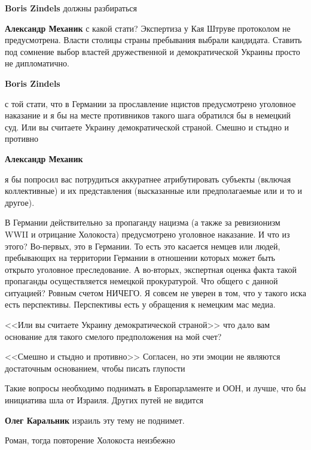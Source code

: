 \begin{itemize}
\begin{itemize}
\textbf{Boris Zindels} должны разбираться

\textbf{Александр Механик} с какой стати? Экспертиза у Кая Штруве протоколом не предусмотрена. Власти столицы страны пребывания выбрали кандидата. Ставить под сомнение выбор властей дружественной и демократической Украины просто не дипломатично.

\textbf{Boris Zindels} 

с той стати, что в Германии за прославление нцистов предусмотрено уголовное
наказание и я бы на месте противников такого шага обратился бы в немецкий суд.
Или вы считаете Украину демократической страной. Смешно и стыдно и противно

\textbf{Александр Механик} 

я бы попросил вас потрудиться аккуратнее атрибутировать субъекты (включая
коллективные) и их представления (высказанные или предполагаемые или и то и
другое).

В Германии действительно за пропаганду нацизма (а также за ревизионизм WWII и
отрицание Холокоста) предусмотрено уголовное наказание. И что из этого?
Во-первых, это в Германии. То есть это касается немцев или людей, пребывающих
на территории Германии в отношении которых может быть открыто уголовное
преследование. А во-вторых, экспертная оценка факта такой пропаганды
осуществляется немецкой прокуратурой. Что общего с данной ситуацией? Ровным
счетом НИЧЕГО. Я совсем не уверен в том, что у такого иска есть перспективы.
Перспективы есть у обращения к немецким мас медиа.

<<Или вы считаете Украину демократической страной>> что дало вам основание для такого смелого предположения на мой счет?

<<Смешно и стыдно и противно>> Согласен, но эти эмоции не являются достаточным основанием, чтобы писать глупости

\end{itemize} %


Такие вопросы необходимо поднимать в Европарламенте и ООН, и лучше, что бы
инициатива шла от Израиля. Других путей не видится

\begin{itemize} %
\textbf{Олег Каральник} израиль эту тему не поднимет.

Роман, тогда повторение Холокоста неизбежно


\end{itemize}
\end{itemize}

